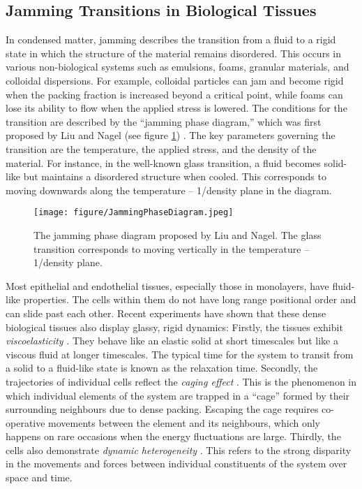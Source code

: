 \documentclass[a4paper,12pt]{article}
\begin{document}
\subsection{Jamming Transitions in Biological Tissues}
In condensed matter, jamming describes the transition from a fluid to a rigid state in which the structure of the material remains disordered. This occurs in various non-biological systems such as emulsions, foams, granular materials, and colloidal dispersions\cite{hecke2010}. For example, colloidal particles can jam and become rigid when the packing fraction is increased beyond a critical point, while foams can lose its ability to flow when the applied stress is lowered. The conditions for the transition are described by the ``jamming phase diagram,'' which was first proposed by Liu and Nagel (see figure \ref{fig:JammingPhaseDiagram}) \cite{liu1998}. The key parameters governing the transition are the temperature, the applied stress, and the density of the material. For instance, in the well-known glass transition, a fluid becomes solid-like but maintains a disordered structure when cooled. This corresponds to moving downwards along the temperature -- 1/density plane in the diagram. 

\begin{figure}[h]
\centering
\texttt{[image: figure/JammingPhaseDiagram.jpeg]}
\caption{The jamming phase diagram proposed by Liu and Nagel. The glass transition corresponds to moving vertically in the temperature -- 1/density plane.}
\label{fig:JammingPhaseDiagram}
\end{figure}

Most epithelial and endothelial tissues, especially those in monolayers, have fluid-like properties. The cells within them do not have long range positional order and can slide past each other. Recent experiments have shown that these dense biological tissues also display glassy, rigid dynamics: Firstly, the tissues exhibit \emph{viscoelasticity} \cite{schoetz2013}. They behave like an elastic solid at short timescales but like a viscous fluid at longer timescales. The typical time for the system to transit from a solid to a fluid-like state is known as the relaxation time. Secondly, the trajectories of individual cells reflect the \emph{caging effect} \cite{schoetz2013}. This is the phenomenon in which individual elements of the system are trapped in a ``cage'' formed by their surrounding neighbours due to dense packing. Escaping the cage requires co-operative movements between the element and its neighbours, which only happens on rare occasions when the energy fluctuations are large. Thirdly, the cells also demonstrate \emph{dynamic heterogeneity} \cite{angelini2010}. This refers to the strong disparity in the movements and forces between individual constituents of the system over space and time. 
\end{document}
